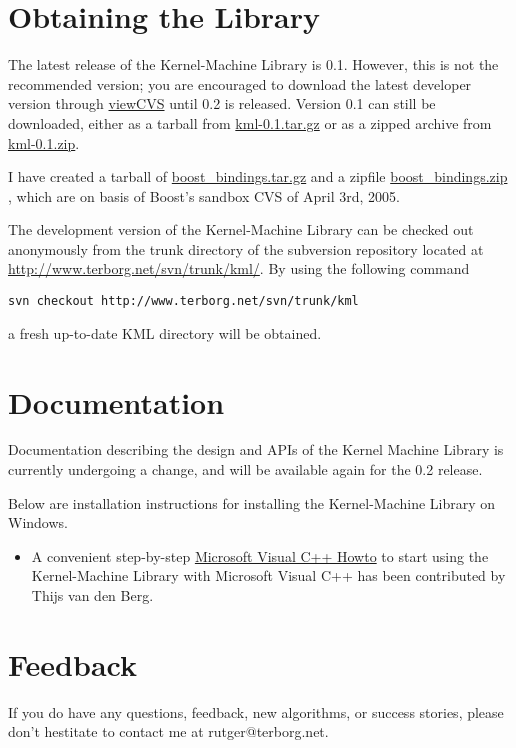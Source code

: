\documentclass{article}
\begin{document}
\section*{Obtaining the Library}
\label{section:downloads}

The latest release of the Kernel-Machine Library is 0.1. However, this is not the recommended version; you are encouraged to
download the latest developer version through  
\href{http://www.terborg.net/cgi-bin/viewcvs.cgi/trunk/kml/}{viewCVS} until 0.2 is released. 
Version 0.1 can still be downloaded, either as a tarball 
from \href{research/kml/kml-0.1.tar.gz}{kml-0.1.tar.gz} or as a zipped archive
from \href{research/kml/kml-0.1.zip}{kml-0.1.zip}.

I have created a tarball of 
\href{research/kml/boost\_bindings.tar.gz}{boost\_bindings.tar.gz}
 and a zipfile 
\href{research/kml/boost\_bindings.zip}{boost\_bindings.zip}%
, which are on basis of Boost's sandbox CVS of April 3rd, 2005.


The development version of the Kernel-Machine Library can be checked out anonymously from 
the trunk directory of the subversion repository located at 
\href{http://www.terborg.net/svn/trunk/kml/}{http://www.terborg.net/svn/trunk/kml/}. By using the following command
\begin{verbatim}
svn checkout http://www.terborg.net/svn/trunk/kml
\end{verbatim}
a fresh up-to-date KML directory will be obtained. 

\section*{Documentation}

Documentation describing the design and APIs of the Kernel Machine Library 
is currently undergoing a change, and will be available again for the 0.2 release.

Below are installation instructions for installing the Kernel-Machine Library on 
Windows.

\begin{itemize}

\item A convenient step-by-step 
\href{research/kml/installation.html}{Microsoft Visual C++ Howto} 
to start using the Kernel-Machine Library with Microsoft Visual C++ has been 
contributed by Thijs van den Berg.

\end{itemize}


\section*{Feedback}

If you do have any questions, feedback, new algorithms, or success stories, 
please don't hestitate to contact me at rutger@terborg.net.




\end{document}
